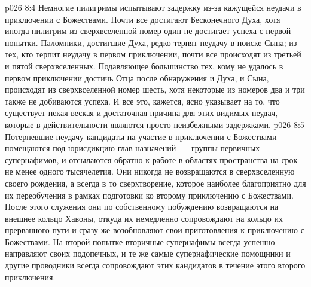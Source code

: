 \vs p026 8:4 \pc Немногие пилигримы испытывают задержку из\hyp{}за кажущейся неудачи в приключении с Божествами. Почти все достигают Бесконечного Духа, хотя иногда пилигрим из сверхвселенной номер один не достигает успеха с первой попытки. Паломники, достигшие Духа, редко терпят неудачу в поиске Сына; из тех, кто терпит неудачу в первом приключении, почти все происходят из третьей и пятой сверхвселенных. Подавляющее большинство тех, кому не удалось в первом приключении достичь Отца после обнаружения и Духа, и Сына, происходят из сверхвселенной номер шесть, хотя некоторые из номеров два и три также не добиваются успеха. И все это, кажется, ясно указывает на то, что существует некая веская и достаточная причина для этих видимых неудач, которые в действительности являются просто неизбежными задержками.
\vs p026 8:5 Потерпевшие неудачу кандидаты на участие в приключении с Божествами помещаются под юрисдикцию глав назначений~--- группы первичных супернафимов, и отсылаются обратно к работе в областях пространства на срок не менее одного тысячелетия. Они никогда не возвращаются в сверхвселенную своего рождения, а всегда в то сверхтворение, которое наиболее благоприятно для их переобучения в рамках подготовки ко второму приключению с Божествами. После этого служения они по собственному побуждению возвращаются на внешнее кольцо Хавоны, откуда их немедленно сопровождают на кольцо их прерванного пути и сразу же возобновляют свои приготовления к приключению с Божествами. На второй попытке вторичные супернафимы всегда успешно направляют своих подопечных, и те же самые супернафические помощники и другие проводники всегда сопровождают этих кандидатов в течение этого второго приключения.
